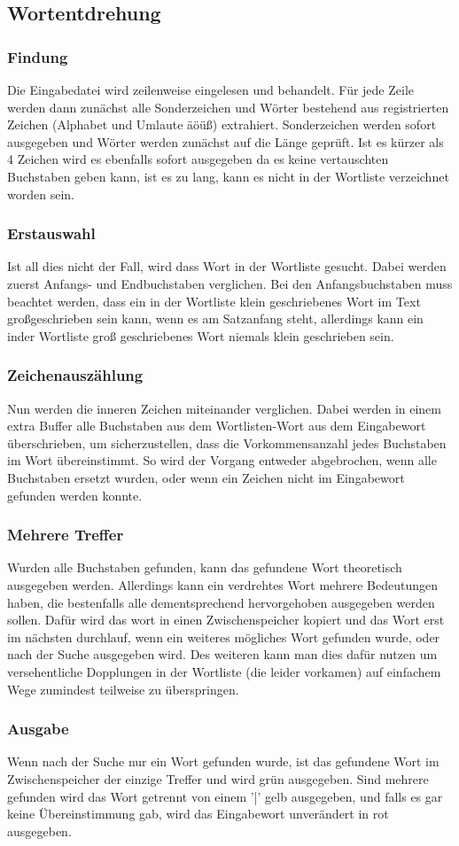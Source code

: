 \documentclass[a4paper,10pt,ngerman]{scrartcl}
\newcommand{\newsubsection}{\vspace{2\baselineskip}\subsection}
\newcommand{\newsubsubsection}{\vspace{1\baselineskip}\subsubsection}
\begin{document}
\newsubsection{Wortentdrehung}

\newsubsubsection{Findung}
Die Eingabedatei wird zeilenweise eingelesen und behandelt. Für jede Zeile werden dann zunächst alle Sonderzeichen und Wörter bestehend aus registrierten Zeichen (Alphabet und Umlaute äöüß) extrahiert. Sonderzeichen werden sofort ausgegeben und Wörter werden zunächst auf die Länge geprüft. Ist es kürzer als 4 Zeichen wird es ebenfalls sofort ausgegeben da es keine vertauschten Buchstaben geben kann, ist es zu lang, kann es nicht in der Wortliste verzeichnet worden sein.

\newsubsubsection{Erstauswahl}
Ist all dies nicht der Fall, wird dass Wort in der Wortliste gesucht. Dabei werden zuerst Anfangs- und Endbuchstaben verglichen. Bei den Anfangsbuchstaben muss beachtet werden, dass ein in der Wortliste klein geschriebenes Wort im Text großgeschrieben sein kann, wenn es am Satzanfang steht, allerdings kann ein inder Wortliste groß geschriebenes Wort niemals klein geschrieben sein.

\newsubsubsection{Zeichenauszählung}
Nun werden die inneren Zeichen miteinander verglichen. Dabei werden in einem extra Buffer alle Buchstaben aus dem Wortlisten-Wort aus dem Eingabewort überschrieben, um sicherzustellen, dass die Vorkommensanzahl jedes Buchstaben im Wort übereinstimmt. So wird der Vorgang entweder abgebrochen, wenn alle Buchstaben ersetzt wurden, oder wenn ein Zeichen nicht im Eingabewort gefunden werden konnte.

\newsubsubsection{Mehrere Treffer}
Wurden alle Buchstaben gefunden, kann das gefundene Wort theoretisch ausgegeben werden. Allerdings kann ein verdrehtes Wort mehrere Bedeutungen haben, die bestenfalls alle dementsprechend hervorgehoben ausgegeben werden sollen. Dafür wird das wort in einen Zwischenspeicher kopiert und das Wort erst im nächsten durchlauf, wenn ein weiteres mögliches Wort gefunden wurde, oder nach der Suche ausgegeben wird. Des weiteren kann man dies dafür nutzen um versehentliche Dopplungen in der Wortliste (die leider vorkamen) auf einfachem Wege zumindest teilweise zu überspringen.

\newsubsubsection{Ausgabe}
Wenn nach der Suche nur ein Wort gefunden wurde, ist das gefundene Wort im Zwischenspeicher der einzige Treffer und wird grün ausgegeben. Sind mehrere gefunden wird das Wort getrennt von einem '|' gelb ausgegeben, und falls es gar keine Übereinstimmung gab, wird das Eingabewort unverändert in rot ausgegeben.
\end{document}
